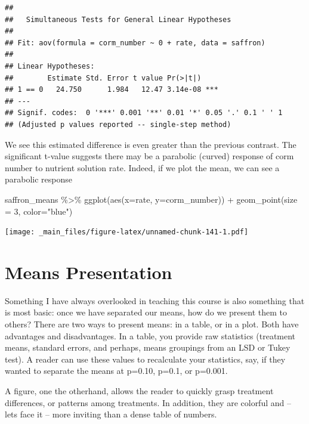 \documentclass[
]{book}
\newenvironment{Shaded}{\begin{snugshade}}{\end{snugshade}}
\newcommand{\AttributeTok}[1]{\textcolor[rgb]{0.77,0.63,0.00}{#1}}
\newcommand{\DecValTok}[1]{\textcolor[rgb]{0.00,0.00,0.81}{#1}}
\newcommand{\FunctionTok}[1]{\textcolor[rgb]{0.00,0.00,0.00}{#1}}
\newcommand{\NormalTok}[1]{#1}
\newcommand{\SpecialCharTok}[1]{\textcolor[rgb]{0.00,0.00,0.00}{#1}}
\newcommand{\StringTok}[1]{\textcolor[rgb]{0.31,0.60,0.02}{#1}}
\begin{document}
\begin{verbatim}
## 
##   Simultaneous Tests for General Linear Hypotheses
## 
## Fit: aov(formula = corm_number ~ 0 + rate, data = saffron)
## 
## Linear Hypotheses:
##        Estimate Std. Error t value Pr(>|t|)    
## 1 == 0   24.750      1.984   12.47 3.14e-08 ***
## ---
## Signif. codes:  0 '***' 0.001 '**' 0.01 '*' 0.05 '.' 0.1 ' ' 1
## (Adjusted p values reported -- single-step method)
\end{verbatim}

We see this estimated difference is even greater than the previous contrast. The significant t-value suggests there may be a parabolic (curved) response of corm number to nutrient solution rate. Indeed, if we plot the mean, we can see a parabolic response

\begin{Shaded}
\begin{Highlighting}[]
\NormalTok{saffron\_means }\SpecialCharTok{\%\textgreater{}\%}
  \FunctionTok{ggplot}\NormalTok{(}\FunctionTok{aes}\NormalTok{(}\AttributeTok{x=}\NormalTok{rate, }\AttributeTok{y=}\NormalTok{corm\_number)) }\SpecialCharTok{+}
  \FunctionTok{geom\_point}\NormalTok{(}\AttributeTok{size =} \DecValTok{3}\NormalTok{, }\AttributeTok{color=}\StringTok{"blue"}\NormalTok{)}
\end{Highlighting}
\end{Shaded}

\texttt{[image: \_main\_files/figure-latex/unnamed-chunk-141-1.pdf]}

\hypertarget{means-presentation}{%
\section{Means Presentation}\label{means-presentation}}

Something I have always overlooked in teaching this course is also something that is most basic: once we have separated our means, how do we present them to others? There are two ways to present means: in a table, or in a plot. Both have advantages and disadvantages. In a table, you provide raw statistics (treatment means, standard errors, and perhaps, means groupings from an LSD or Tukey test). A reader can use these values to recalculate your statistics, say, if they wanted to separate the means at p=0.10, p=0.1, or p=0.001.

A figure, one the otherhand, allows the reader to quickly grasp treatment differences, or patterns among treatments. In addition, they are colorful and -- lets face it -- more inviting than a dense table of numbers.
\end{document}
